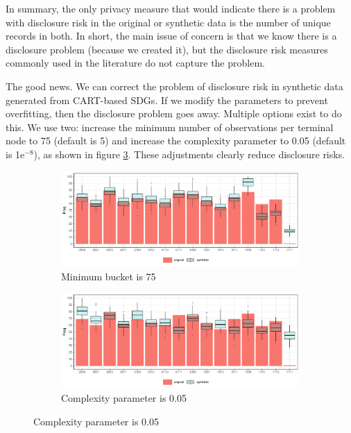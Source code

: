 \documentclass[runningheads]{llncs}
\begin{document}
In summary, the only privacy measure that would indicate there is a problem with disclosure risk in the original or synthetic data is the number of unique records in both.  In short, the main issue of concern is that we know there is a disclosure problem (because we created it), but the disclosure risk measures commonly used in the literature do not capture the problem.  

The good news.  We can correct the problem of disclosure risk in synthetic data generated from CART-based SDGs.  If we modify the parameters to prevent overfitting, then the disclosure problem goes away.  Multiple options exist to do this.  We use two: increase the minimum number of observations per terminal node to 75 (default is 5) and increase the complexity parameter to 0.05 (default is 1e$^{-8}$), as shown in figure \ref{fig:compare_modified}.  These adjustments clearly reduce disclosure risks.

\begin{figure}[!h]
    \centering
    \caption{Compare original and synthetic data}
    \begin{subfigure}{0.48\textwidth}
        \includegraphics[width=\textwidth]{../graphs/graph_cart_modified_mb_histogram_compare_100.pdf}
        \caption{Minimum bucket is 75}
        \label{fig:attacker_modified_mb}
    \end{subfigure}
    \hfill
    \begin{subfigure}{0.48\textwidth}
        \includegraphics[width=\textwidth]{../graphs/graph_cart_modified_cp_histogram_compare_100.pdf}
        \caption{Complexity parameter is 0.05}
        \label{fig:attacker_modified_cp}
    \end{subfigure}
    \label{fig:compare_modified}
\end{figure}
\end{document}
